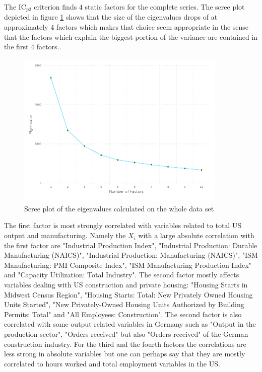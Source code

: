 \documentclass[12pt]{article}
\begin{document}
The IC$_{p2}$ criterion finds $4$ static factors for the complete series. The scree plot depicted in figure \ref{screeplot} shows that the size of the eigenvalues drops of at approximately $4$ factors which makes that choice seem appropriate in the sense that the factors which explain the biggest portion of the variance are contained in the first $4$ factors..

\begin{figure}[htp]
\centering
\includegraphics[width=10cm]{graphs/screeplot.png}
\caption{Scree plot of the eigenvalues calculated on the whole data set}
\label{screeplot}
\end{figure}


The first factor is most strongly correlated with variables related to total US output and manufacturing. Namely the $X_i$ with a large absolute correlation with the first factor are "Industrial Production Index", "Industrial Production: Durable Manufacturing (NAICS)", "Industrial Production: Manufacturing (NAICS)", "ISM Manufacturing: PMI Composite Index", "ISM Manufacturing Production Index" and "Capacity Utilization: Total Industry".
The second factor mostly affects variables dealing with US construction and private housing: "Housing Starts in Midwest Census Region", "Housing Starts: Total: New Privately Owned Housing Units Started", "New Privately-Owned Housing Units Authorized by Building Permits: Total" and "All Employees: Construction". The second factor is also correlated with some output related variables in Germany such as "Output in the production sector", "Orders received" but also "Orders received" of the German construction industry.
For the third and the fourth factors the correlations are less strong in absolute variables but one can perhaps say that they are mostly correlated to hours worked and total employment variables in the US. 
\end{document}
